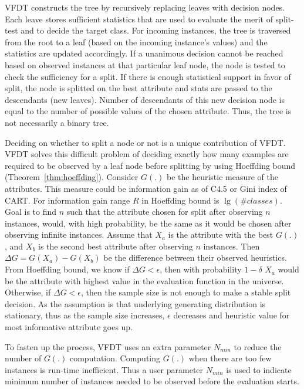 VFDT constructs the tree by recursively replacing leaves with decision nodes. Each leave stores sufficient statistics that are used to evaluate the merit of split-test and to decide the target class. For incoming instances, the tree is traversed from the root to a leaf (based on the incoming instance's values) and the statistics are updated accordingly. If a unanimous decision cannot be reached based on observed instances at that particular leaf node, the node is tested to check the sufficiency for a split. If there is enough statistical support in favor of split, the node is splitted on the best attribute and stats are passed to the descendants (new leaves). Number of descendants of this new decision node is equal to the number of possible values of the chosen attribute. Thus, the tree is not necessarily a binary tree.

Deciding on whether to split a node or not is a unique contribution of VFDT. VFDT solves this difficult problem of deciding exactly how many examples are required to be observed by a leaf node before splitting by using Hoeffding bound (Theorem~\ref{thm:hoeffding}). Consider $G(.)$ be the heuristic measure of the attributes. This measure could be information gain as of C4.5 or Gini index of CART. For information gain range $R$ in Hoeffding bound is $\lg (\#classes)$. Goal is to find $n$ such that the attribute chosen for split after observing $n$ instances, would, with high probability, be the same as it would be chosen after observing infinite instances. Assume that $X_a$ is the attribute with the best $G(.)$, and $X_b$ is the second best attribute after observing $n$ instances. Then $\Delta G = G(X_a) - G(X_b)$ be the difference between their observed heuristics. From Hoeffding bound, we know if $\Delta G < \epsilon$, then with probability $1 - \delta$ $X_a$ would be the attribute with highest value in the evaluation function in the universe. Otherwise, if $\Delta G < \epsilon$, then the sample size is not enough to make a stable split decision. As the assumption is that underlying generating distribution is stationary, thus as the sample size increases, $\epsilon$ decreases and heuristic value for most informative attribute goes up.

To fasten up the process, VFDT uses an extra parameter $N_{min}$ to reduce the number of $G(.)$ computation. Computing $G(.)$ when there are too few instances is run-time inefficient. Thus a user parameter $N_{min}$ is used to indicate minimum number of instances needed to be observed before the evaluation starts.

